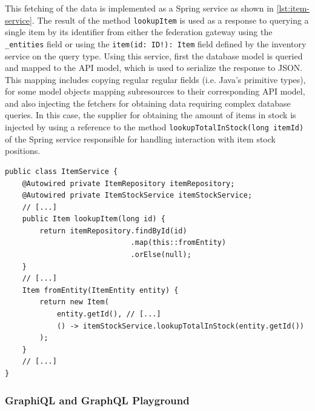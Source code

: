 This fetching of the data is implemented as a Spring service as shown in \autoref{lst:item-service}.
The result of the method \texttt{lookupItem} is used as a response to querying a single item by its identifier from either the federation gateway using the \texttt{\_entities} field or using the \texttt{item(id: ID!): Item} field defined by the inventory service on the query type.
Using this service, first the database model is queried and mapped to the \ac{API} model, which is used to serialize the response to \ac{JSON}.
This mapping includes copying regular regular fields (i.e. Java's primitive types), for some model objects mapping subresources to their corresponding \ac{API} model, and also injecting the fetchers for obtaining data requiring complex database queries.
In this case, the supplier for obtaining the amount of items in stock is injected by using a reference to the method \texttt{lookupTotalInStock(long itemId)} of the Spring service responsible for handling interaction with item stock positions.

\begin{lstlisting}[caption={\acs{API} Model Creation with Fetcher Injection}, style=java-ext, label={lst:item-service}]
public class ItemService {
    @Autowired private ItemRepository itemRepository;
    @Autowired private ItemStockService itemStockService;
    // [...]
    public Item lookupItem(long id) {
        return itemRepository.findById(id)
                             .map(this::fromEntity)
                             .orElse(null);
    }
    // [...]
    Item fromEntity(ItemEntity entity) {
        return new Item(
            entity.getId(), // [...]
            () -> itemStockService.lookupTotalInStock(entity.getId())
        );
    }
    // [...]
}
\end{lstlisting}

\subsubsection{GraphiQL and GraphQL Playground}

